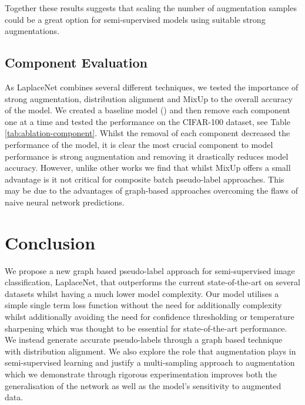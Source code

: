 \documentclass[journal]{IEEEtran}
\begin{document}
Together these results suggests that scaling the number of augmentation samples could be a great option for semi-supervised models using suitable strong augmentations. 

\subsection{Component Evaluation}

As LaplaceNet combines several different techniques, we tested the importance of strong augmentation, distribution alignment and MixUp to the overall accuracy of the model. We created a baseline model () and then remove each component one at a time and tested the performance on the CIFAR-100 dataset, see Table \ref{tab:ablation-component}. Whilst the removal of each component decreased the performance of the model, it is clear the most crucial component to model performance is strong augmentation and removing it drastically reduces model accuracy. However, unlike other works \cite{arazo2019pseudo} we find that whilst MixUp \cite{zhang2017mixup} offers a small advantage is it not critical for composite batch pseudo-label approaches. This may be due to the advantages of graph-based approaches overcoming the flaws of naive neural network predictions. 

\vspace{0.5cm}

\section{Conclusion}

We propose a new graph based pseudo-label approach for semi-supervised image classification, LaplaceNet, that outperforms the current state-of-the-art on several datasets whilst having a much lower model complexity. Our model utilises a simple single term loss function without the need for additionally complexity whilst additionally avoiding the need for confidence thresholding or temperature sharpening which was thought to be essential for state-of-the-art performance. We instead generate accurate pseudo-labels through a graph based technique with distribution alignment.  We also explore the role that augmentation plays in semi-supervised learning and justify a multi-sampling approach to augmentation which we demonstrate through rigorous experimentation improves both the generalisation of the network as well as the model's sensitivity to augmented data. 
\end{document}
